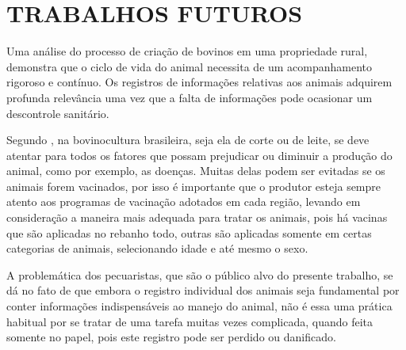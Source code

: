 %
%


\chapter{\textbf{TRABALHOS FUTUROS}}\label{chap:trabsFuturos}

Uma análise do processo de criação de bovinos em uma propriedade rural, demonstra que o ciclo de vida do animal necessita de um acompanhamento rigoroso e contínuo. Os registros de informações relativas aos animais adquirem profunda relevância uma vez que a falta de informações pode ocasionar um descontrole sanitário.

Segundo , na bovinocultura brasileira, seja ela de corte ou de leite, se deve atentar para todos os fatores que possam prejudicar ou diminuir a produção do animal, como por exemplo, as doenças. Muitas  delas podem ser evitadas se os animais forem vacinados, por isso é importante que o produtor esteja sempre atento aos programas de vacinação adotados em cada região, levando em consideração a maneira mais adequada para tratar os animais, pois há vacinas que são aplicadas no rebanho todo, outras são aplicadas somente em certas categorias de animais, selecionando idade e até mesmo o sexo.

A problemática dos pecuaristas, que são o público alvo do presente trabalho, se dá no fato de que embora o registro individual dos animais seja fundamental por conter informações indispensáveis ao manejo do animal, não é essa uma prática habitual por se tratar de uma tarefa muitas vezes complicada, quando feita somente no papel, pois este registro pode ser perdido ou danificado.

